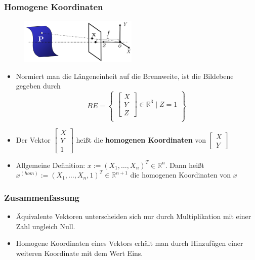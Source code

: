 \documentclass[12pt, a4paper, oneside]{article}
\begin{document}
\subsubsection{Homogene Koordinaten}

\begin{figure}[!h]
    \centering
    \includegraphics[width=0.5\textwidth]{../img/2-6.png}
    \label{img/2-6}
\end{figure}

\begin{itemize}
    \item Normiert man die Längeneinheit auf die Brennweite, ist die Bildebene gegeben durch
    $$BE=
    \begin{Bmatrix}
        \begin{bmatrix}
            X \\
            Y \\
            Z
        \end{bmatrix}\in\mathbb{R}^3\;|\;Z=1 \\
    \end{Bmatrix}\
    $$
    \item Der Vektor $\begin{bmatrix}
        X \\
        Y \\
        1
    \end{bmatrix}$ heißt die \textbf{homogenen Koordinaten} von $\begin{bmatrix}
        X \\
        Y
    \end{bmatrix}$
    \item Allgemeine Definition: $x:=(X_1,\dots,X_n)^T\in\mathbb{R}^n$.
    Dann heißt $x^{(hom)}:=(X_1,\dots,X_n,1)^T\in\mathbb{R}^{n+1}$ die homogenen Koordinaten von $x$
\end{itemize}

\subsubsection{Zusammenfassung}

\begin{itemize}
    \item Äquivalente Vektoren unterscheiden sich nur durch Multiplikation mit einer Zahl ungleich Null.
    \item Homogene Koordinaten eines Vektors erhält man durch Hinzufügen einer weiteren Koordinate mit dem Wert Eins.
\end{itemize}
\end{document}
